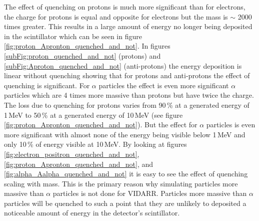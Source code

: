 The effect of quenching on protons is much more significant than for electrons, the charge for protons is equal and opposite for electrons but the mass is $\sim$ 2000 times greater. This results in a large amount of energy no longer being deposited in the scintillator which can be seen in figure \ref{fig:proton_Apronton_quenched_and_not}. In figures \ref{subFig:proton_quenched_and_not} (protons) and \ref{subFig:Aproton_quenched_and_not} (anti-protons) the energy deposition is linear without quenching showing that for protons and anti-protons the effect of quenching is significant. For $\alpha$ particles the effect is even more significant $\alpha$ particles which are 4 times more massive than protons but have twice the charge. The loss due to quenching for protons varies from 90\,\% at a generated energy of 1\,MeV to 50\,\% at a generated energy of 10\,MeV (see figure \ref{fig:proton_Apronton_quenched_and_not}). But the effect for $\alpha$ particles is even more significant with almost none of the energy being visible below 1\,MeV and only 10\,\% of energy visible at 10\,MeV. By looking at figures \ref{fig:electron_positron_quenched_and_not}, \ref{fig:proton_Apronton_quenched_and_not}, and \ref{fig:alpha_Aalpha_quenched_and_not} it is easy to see the effect of quenching scaling with mass. This is the primary reason why simulating particles more massive than $\alpha$ particles is not done for VIDARR. Particles more massive than $\alpha$ particles will be quenched to such a point that they are unlikely to deposited a noticeable amount of energy in the detector's scintillator. 

